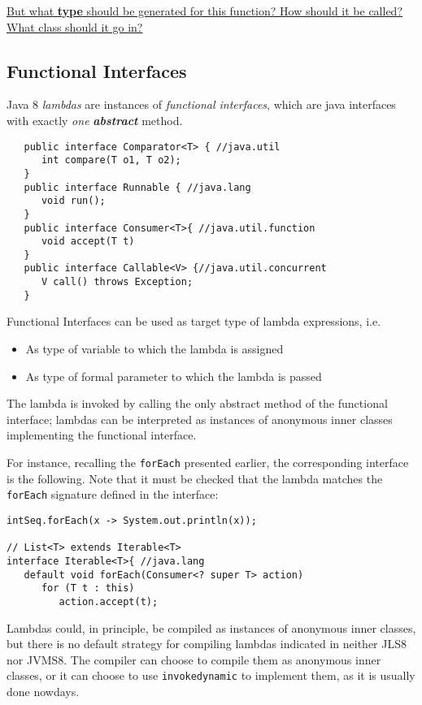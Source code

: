 \ul{But what \textbf{type} should be generated for this function? How should it be called? What class should it go in?}

\subsection{Functional Interfaces}

Java 8 \textit{lambdas} are instances of \textit{functional interfaces},
which are java interfaces with exactly \textit{one} \textit{\textbf{abstract}} method.

\begin{lstlisting}
   public interface Comparator<T> { //java.util
      int compare(T o1, T o2);
   }
   public interface Runnable { //java.lang
      void run();
   }
   public interface Consumer<T>{ //java.util.function
      void accept(T t)
   }
   public interface Callable<V> {//java.util.concurrent
      V call() throws Exception;
   }
\end{lstlisting}
{Functional Interfaces can be used as target type of lambda
expressions, i.e.\ns
\begin{itemize}
	\item As type of variable to which the lambda is assigned
	\item As type of formal parameter to which the lambda is passed
\end{itemize}}

The lambda is invoked by calling the only abstract method
of the functional interface;
lambdas can be interpreted as instances of anonymous
inner classes implementing the functional interface.

For instance, recalling the \lstinline|forEach| presented earlier, the corresponding interface is the following.
Note that it must be checked that the lambda matches the \lstinline|forEach| signature defined in the interface:
\begin{lstlisting}
intSeq.forEach(x -> System.out.println(x));

// List<T> extends Iterable<T>
interface Iterable<T>{ //java.lang
   default void forEach(Consumer<? super T> action)
      for (T t : this)
         action.accept(t);
\end{lstlisting}

Lambdas could, in principle, be compiled as instances of anonymous inner classes, but there is no default strategy for compiling lambdas indicated in neither JLS8 nor JVMS8. The compiler can choose to compile them as anonymous inner classes, or it can choose to use \lstinline|invokedynamic| to implement them, as it is usually done nowdays.

